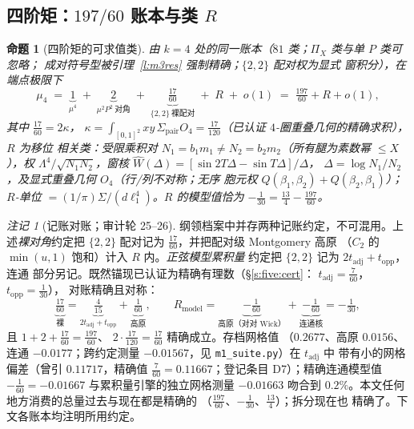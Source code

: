 \documentclass[11pt]{article}
\numberwithin{equation}{section}
\newtheorem{proposition}[theorem]{命题}
\theoremstyle{definition}
\theoremstyle{remark}
\newtheorem{remark}[theorem]{注记}
\newcommand{\LL}{\Lambda}
\begin{document}
\subsection{四阶矩：$197/60$ 账本与类 $R$}\label{s:cert:R}

\begin{proposition}[四阶矩的可求值类]\label{p:m4classical}
由 $k=4$ 处的同一账本（$81$ 类；$\Pi_X$ 类与单 $P$ 类可忽略；
成对符号型被引理~\ref{l:m3res} 强制精确；$\{2,2\}$ 配对权为显式
窗积分），在端点极限下
\[
\mu_4\;=\;\underbrace{1}_{\mu^4}
\;+\;\underbrace{2}_{\mu^2P^2\ \text{对角}}
\;+\;\underbrace{\tfrac{17}{60}}_{\{2,2\}\ \text{裸配对}}
\;+\;R\;+\;o(1)\;=\;\tfrac{197}{60}+R+o(1),
\]
其中 $\tfrac{17}{60}=2\kappa$，
$\kappa=\int_{[0,1]^2}xy\,\Sigma_{\mathrm{pair}}O_4
=\tfrac{17}{120}$（已认证 $4$-圈重叠几何的精确求积），$R$ 为移位
相关类：受限乘积对 $N_1=b_1m_1\ne N_2=b_2m_2$（所有腿为素数幂
$\le X$），权 $\LL^4/\sqrt{N_1N_2}$，窗核
$\widehat W(\Delta)=[\sin2T\Delta-\sin T\Delta]/\Delta$，
$\Delta=\log N_1/N_2$，及显式重叠几何 $O_4$（行/列不对称；无序
胞元权 $Q(\beta_1,\beta_2)+Q(\beta_2,\beta_1)$）；$R$-单位
$=(1/\pi)\Sigma/(d\ell_1^4)$。$R$ 的模型值恰为
$-\tfrac1{30}=\tfrac{13}4-\tfrac{197}{60}$。
\end{proposition}

\begin{remark}[记账对账；审计轮 25--26]\label{r:books}
纲领档案中并存两种记账约定，不可混用。上述\emph{裸对角}约定把
$\{2,2\}$ 配对记为 $\tfrac{17}{60}$，并把配对级 Montgomery 高原
（$C_2$ 的 $\min(u,1)$ 饱和）计入 $R$ 内。\emph{正弦模型累积量}
约定把 $\{2,2\}$ 记为 $2t_{\mathrm{adj}}+t_{\mathrm{opp}}$，连通
部分另记。既然锚现已认证为精确有理数（\S\ref{s:five:cert}：
$t_{\mathrm{adj}}=\tfrac7{60}$，$t_{\mathrm{opp}}=\tfrac1{30}$），
对账精确且对称：
\[
\underbrace{\tfrac{17}{60}}_{\text{裸}}
=\underbrace{\tfrac4{15}}_{2t_{\mathrm{adj}}+t_{\mathrm{opp}}}
+\underbrace{\tfrac1{60}}_{\text{高原}},
\qquad
R_{\mathrm{model}}
=\underbrace{-\tfrac1{60}}_{\text{高原（对对 Wick）}}
+\underbrace{-\tfrac1{60}}_{\text{连通核}}
=-\tfrac1{30},
\]
且 $1+2+\tfrac{17}{60}=\tfrac{197}{60}$、
$2\cdot\tfrac{17}{120}=\tfrac{17}{60}$ 精确成立。存档网格值
（$0.2677$、高原 $0.0156$、连通 $-0.0177$；跨约定测量
$-0.01567$，见 \texttt{m1\_suite.py}）在 $t_{\mathrm{adj}}$ 中
带有小的网格偏差（曾引 $0.11717$，精确值
$\tfrac7{60}=0.11667$；登记条目 D7）；精确连通模型值
$-\tfrac1{60}=-0.01667$ 与累积量引擎的独立网格测量 $-0.01663$
吻合到 $0.2\%$。本文任何地方消费的总量过去与现在都是精确的
（$\tfrac{197}{60}$、$-\tfrac1{30}$、$\tfrac{13}4$）；拆分现在也
精确了。下文各账本均注明所用约定。
\end{remark}
\end{document}
